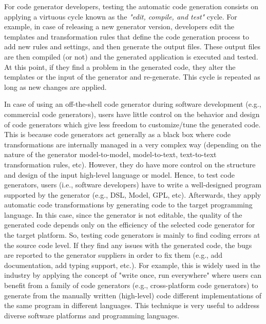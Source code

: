 For code generator developers, testing the automatic code generation consists on applying a virtuous cycle known as the \textit{"edit, compile, and test"} cycle. 
For example, in case of releasing a new generator version, developers edit the templates and transformation rules that define the code generation process to add new rules and settings, and then generate the output files. These output files are then compiled (or not) and the generated application is executed and tested. At this point, if they find a problem in the generated code, they alter the templates or the input of the generator and re-generate. This cycle is repeated as long as new changes are applied. 

In case of using an off-the-shell code generator during software development (e.g., commercial code generators), users have little control on the behavior and design of code generators which give less freedom to customize/tune the generated code. This is because code generators act generally as a black box where code transformations are internally managed in a very complex way (depending on the nature of the generator model-to-model, model-to-text, text-to-text transformation rules, etc).
However, they do have more control on the structure and design of the input high-level language or model. 
Hence, to test code generators, users (i.e., software developers) have to write a well-designed program supported by the generator (e.g., DSL, Model, GPL, etc). Afterwards, they apply automatic code transformations by generating code to the target programming language. In this case, since the generator is not editable, the quality of the generated code depends only on the efficiency of the selected code generator for the target platform. So, testing code generators is mainly to find coding errors at the source code level. If they find any issues with the generated code, the bugs are reported to the generator suppliers in order to fix them (e.g., add documentation, add typing support, etc.).
For example, this is widely used in the industry by applying the concept of "write once, run everywhere" where users can benefit from a family of code generators (e.g., cross-platform code generators\cite{fumero2015runtime}) to generate from the manually written (high-level) code different implementations of the same program in different languages. This technique is very useful to address diverse software platforms and programming languages.





